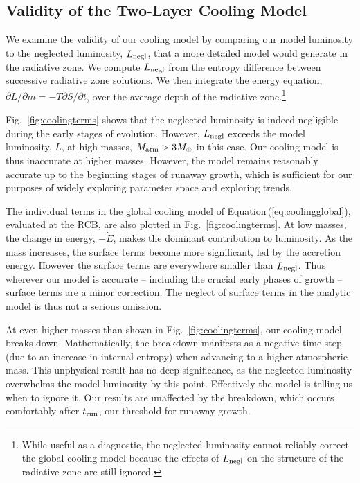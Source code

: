 \documentclass[apj, numberedappendix]{emulateapj}
\newcommand{\p}{\partial}
\newcommand{\Eq}[1]{Equation\,(\ref{#1})}
\newcommand{\Fig}[1]{Fig.~\ref{#1}}
\begin{document}
\subsection{Validity of the Two-Layer Cooling Model}
\label{sec:endoftime}

We examine the  validity of our cooling model by comparing our model luminosity to the neglected luminosity, $L_{\rm negl}$,  that a more detailed model would generate in the radiative zone.  We compute $L_{\rm negl}$ from the entropy difference between successive radiative zone solutions.  We then integrate the energy equation, $\p L / \p m = - T \p S/ \p t$, over the average depth of the radiative zone.\footnote{While useful as a diagnostic, the neglected luminosity cannot reliably correct the global cooling model because the effects of $L_{\rm negl}$ on the structure of the radiative zone are still ignored.}

 \Fig{fig:coolingterms} shows that the neglected luminosity is indeed negligible during the early stages of evolution.  However, $L_{\rm negl}$ exceeds the model luminosity, $L$, at high masses, $M_{\rm atm} > 3 M_\oplus$ in this case.  Our cooling model is thus inaccurate at higher masses.  However, the model remains reasonably accurate up to the beginning stages of runaway growth, which is sufficient for our purposes of widely exploring parameter space and exploring trends.
 
The individual terms in the global cooling model of \Eq{eq:coolingglobal}, evaluated at the RCB, are also plotted in \Fig{fig:coolingterms}.  At low masses, the change in energy, $- \dot{E}$, makes the dominant contribution to luminosity.  As the mass increases, the surface terms become more significant, led by the accretion energy.  However the surface terms are everywhere smaller than $L_{\rm negl}$.  Thus wherever our model is accurate -- including the crucial early phases of growth -- surface terms are a minor correction.  The neglect of surface terms in the analytic model is thus not a serious omission.

At even higher masses than shown in \Fig{fig:coolingterms}, our cooling model breaks down.  Mathematically, the breakdown manifests as a negative time step (due to an increase in internal entropy) when advancing to a higher atmospheric mass.  This unphysical result has no deep significance, as the neglected luminosity overwhelms the model luminosity by this point.    Effectively the model is telling us when to ignore it.  Our results are unaffected by the breakdown, which occurs comfortably after $t_{\rm run}$, our threshold for runaway growth.  
\end{document}
